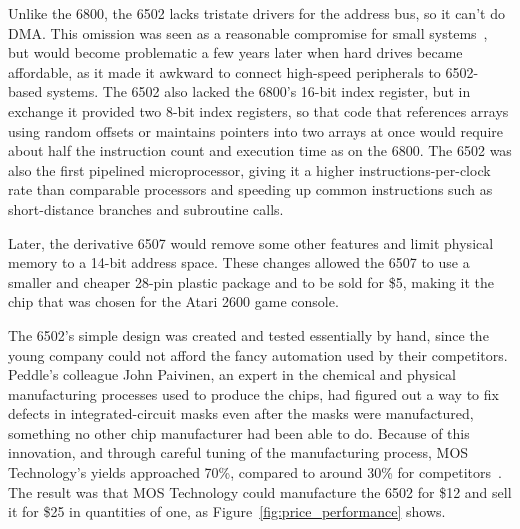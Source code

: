 \begin{tangent}
    Unlike the 6800, the 6502 lacks
    tristate drivers for the address bus, so it can't do DMA.  This
    omission was seen as a reasonable compromise
    for small systems~\cite{byte75:6502}, but would become
    problematic a few years later when hard drives became affordable, as
    it made it awkward to connect high-speed peripherals to 6502-based systems.
    The 6502 also lacked the 6800's 16-bit index register, but in exchange
    it provided two
     8-bit index registers, so that code that references arrays using
     random offsets or maintains pointers into two arrays at once would
     require about half the instruction count and execution time as on
     the 6800.
    The 6502 was also the first pipelined
    microprocessor, giving it a higher instructions-per-clock 
    rate than comparable processors and speeding up
    common instructions such as short-distance branches
     and subroutine calls.

    Later, the derivative 6507 would
    remove some other features and limit
    physical memory to a 14-bit address space.  These changes allowed
    the 6507 to
    use a smaller and cheaper 28-pin 
    plastic package and to be sold for \$5,
    making it the chip that was chosen for the Atari 2600 game console.
\end{tangent}

The 6502's simple design was created and tested essentially by hand,
since the young company could not afford the
fancy automation used by their competitors.
Peddle's colleague John Paivinen, an expert in the chemical
and physical manufacturing processes used to produce the chips, had
figured out a way to fix defects in integrated-circuit masks even after the masks were
manufactured, something no other chip manufacturer had been able to do.
Because of this innovation, and through careful tuning of the manufacturing process,
MOS Technology's yields approached 70\%,
compared to around 30\% for competitors~\cite{commodore}.
The result was that MOS Technology could manufacture the 6502 for \$12
and sell it for \$25 in  quantities of one, as
Figure~\ref{fig:price_performance} shows.

